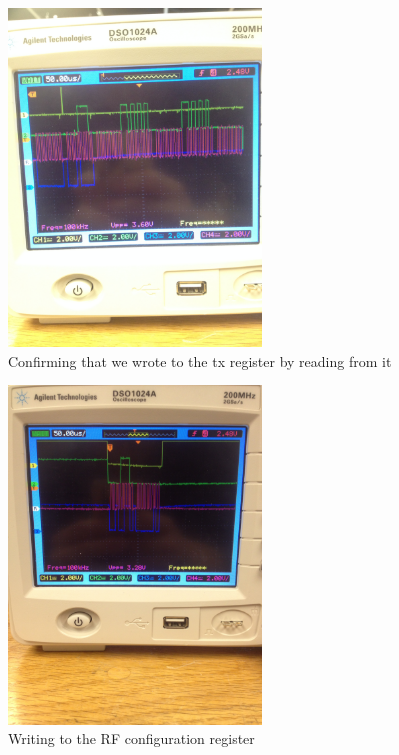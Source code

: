 \documentclass{article}
\begin{document}
\begin{figure}[H]
    \centering
    \includegraphics[width=0.6\textwidth,angle=-90]{tx_addr_read.jpg}
    \caption{Confirming that we wrote to the tx register by reading from it}
\end{figure}

\begin{figure}[H]
    \centering
    \includegraphics[width=0.6\textwidth,angle=-90]{pwr_config_write.jpg}
    \caption{Writing to the RF configuration register}
\end{figure}
\end{document}
